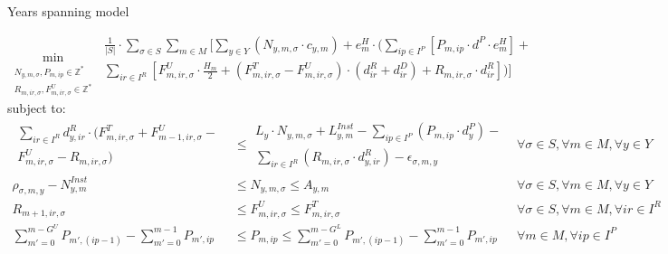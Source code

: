 \documentclass{beamer}
\newcommand{\smalld}{\tiny}
\begin{document}
\begin{frame}{Years spanning model}
\smalld

\begin{equation}
	\min_{\substack{N_{y,m,\sigma}, P_{m,ip} \in \mathbb{Z}^* \\ 
	R_{m,ir,\sigma}, F^U_{m,ir,\sigma} \in \mathbb{Z}^* }}
	\begin{aligned}
	\frac{1}{|S|} \cdot \sum_{\sigma \in S} \sum_{m \in M} [ \sum_{y \in Y} 
	(N_{y,m,\sigma} \cdot c_{y,m}) +  
	e^H_m \cdot (\sum_{ip \in I^P} [P_{m,ip} \cdot d^P \cdot e^H_m] + \\
	\sum_{ir \in I^R}[F^U_{m,ir,\sigma} \cdot \frac{H_m}{2} + 
	(F^T_{m,ir,\sigma} - F^U_{m,ir,\sigma}) \cdot (d^R_{ir} + d^D_{ir}) + 
	R_{m,ir,\sigma}  \cdot d^R_{ir}])]
	\end{aligned}	
\end{equation}
subject to:
\begin{align}
\begin{aligned} \sum_{ir\in I^R} d^R_{y, ir} \cdot (F^T_{m,ir,\sigma} + F^U_{m-1,ir,\sigma} - \\ 
F^U_{m,ir,\sigma} - R_{m,ir,\sigma}) \end{aligned}	
						&\leq		\begin{aligned} L_y \cdot N_{y,m,\sigma} + L^{Inst}_{y,m} - \sum_{ip \in I^P} (P_{m,ip} \cdot d^P_y) - \\ 
					\sum_{ir \in I^R} (R_{m,ir,\sigma} \cdot d^R_{y,ir}) -  \epsilon_{\sigma, m, y} \end{aligned}		& \forall \sigma \in S, \forall m \in M, \forall y \in Y	\\
\rho_{ \sigma, m, y} - N^{Inst}_{y,m}	&\leq		 N_{y,m,\sigma}	\leq 	A_{y,m} 							& \forall \sigma \in S, \forall m \in M, \forall y \in Y 	\\
R_{m+1,ir,\sigma}				&\leq		F^U_{m,ir,\sigma}	\leq	F^T_{m, ir, \sigma}						& \forall \sigma \in S, \forall m \in M, \forall ir \in I^R	\\
\sum_{m' = 0}^{m-G^U} P_{m',(ip-1)} - \sum_{m' = 0}^{m-1} P_{m',ip} 	&\leq P_{m,ip}	\leq 	\sum_{m' = 0}^{m-G^L} P_{m',(ip-1)} - \sum_{m' = 0}^{m-1} P_{m',ip}	
																				& \forall m \in M, \forall ip \in I^P			
\end{align}

\end{frame}
\end{document}

